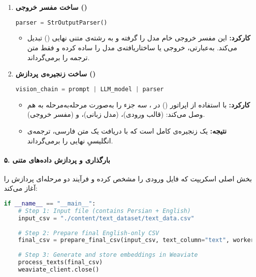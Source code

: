 \documentclass{article}
\begin{document}
\begin{enumerate}
    \item \textbf{ساخت مفسر خروجی ()}
    \begin{latin}
        \begin{lstlisting}[language=Python]
parser = StrOutputParser()
        \end{lstlisting}
    \end{latin}
    \begin{itemize}
        \item \textbf{کارکرد:} این مفسر خروجی خام مدل را گرفته و به رشته‌ی متنی نهایی () تبدیل می‌کند. به‌عبارتی، خروجی  یا ساختار‌یافته‌ی مدل را ساده کرده و فقط متن ترجمه را برمی‌گرداند.
    \end{itemize}

    \item \textbf{ساخت زنجیره‌ی پردازش ()}
    \begin{latin}
        \begin{lstlisting}[language=Python]
vision_chain = prompt | LLM_model | parser
        \end{lstlisting}
    \end{latin}
    \begin{itemize}
        \item \textbf{کارکرد:} با استفاده از اپراتور  (\lr{|}) در ، سه جزء را به‌صورت مرحله‌به‌مرحله به هم وصل می‌کند:  (قالب ورودی)،  (مدل زبانی)، و  (مفسر خروجی).
        \item \textbf{نتیجه:}  یک زنجیره‌ی کامل است که با دریافت یک متن فارسی، ترجمه‌ی انگلیسیِ نهایی را برمی‌گرداند.
    \end{itemize}
\end{enumerate}

\paragraph{۵. بارگذاری و پردازش داده‌های متنی}

بخش اصلی اسکریپت که فایل ورودی  را مشخص کرده و فرآیند دو مرحله‌ای پردازش را آغاز می‌کند:

\begin{latin}
\begin{lstlisting}[language=Python]
if __name__ == "__main__":
    # Step 1: Input file (contains Persian + English)
    input_csv = "./content/text_dataset/text_data.csv"
    
    # Step 2: Prepare final English-only CSV
    final_csv = prepare_final_csv(input_csv, text_column="text", workers=2)
    
    # Step 3: Generate and store embeddings in Weaviate
    process_texts(final_csv)
    weaviate_client.close()
\end{lstlisting}
\end{latin}
\end{document}
